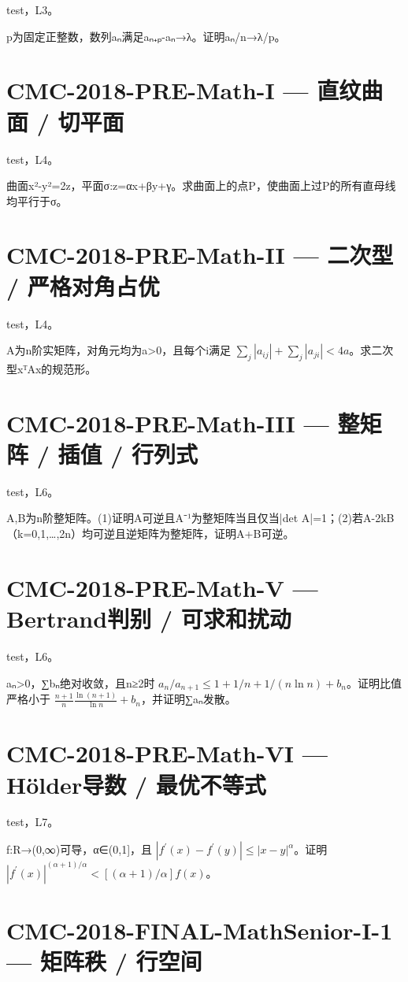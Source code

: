 \documentclass[UTF8]{ctexart}
\begin{document}
test，L3。

p为固定正整数，数列aₙ满足aₙ₊ₚ-aₙ→λ。证明aₙ/n→λ/p。

\section*{CMC-2018-PRE-Math-I — 直纹曲面 / 切平面}

test，L4。

曲面x²-y²=2z，平面σ:z=αx+βy+γ。求曲面上的点P，使曲面上过P的所有直母线均平行于σ。

\section*{CMC-2018-PRE-Math-II — 二次型 / 严格对角占优}

test，L4。

A为n阶实矩阵，对角元均为a>0，且每个i满足 $\sum_j|a_{ij}|+\sum_j|a_{ji}|<4a$。求二次型xᵀAx的规范形。

\section*{CMC-2018-PRE-Math-III — 整矩阵 / 插值 / 行列式}

test，L6。

A,B为n阶整矩阵。(1)证明A可逆且A⁻¹为整矩阵当且仅当|det A|=1；(2)若A-2kB（k=0,1,…,2n）均可逆且逆矩阵为整矩阵，证明A+B可逆。

\section*{CMC-2018-PRE-Math-V — Bertrand判别 / 可求和扰动}

test，L6。

aₙ>0，∑bₙ绝对收敛，且n≥2时 $a_n/a_{n+1}\le1+1/n+1/(n\ln n)+b_n$。证明比值严格小于 $\frac{n+1}{n}\frac{\ln(n+1)}{\ln n}+b_n$，并证明∑aₙ发散。

\section*{CMC-2018-PRE-Math-VI — Hölder导数 / 最优不等式}

test，L7。

f:R→(0,∞)可导，α∈(0,1]，且 $|f^{\prime}(x)-f^{\prime}(y)|\le|x-y|^\alpha$。证明 $|f^{\prime}(x)|^{(\alpha+1)/\alpha}<[(\alpha+1)/\alpha]f(x)$。

\section*{CMC-2018-FINAL-MathSenior-I-1 — 矩阵秩 / 行空间}
\end{document}
